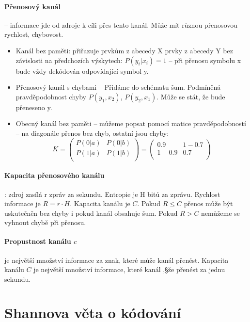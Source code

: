 \documentclass[a4paper, 11pt]{report}
\begin{document}
\paragraph{Přenosový kanál} -- informace jde od zdroje k cíli přes tento kanál. Může mít různou přenosovou rychlost, chybovost.
\begin{itemize}
	\item Kanál bez paměti: přiřazuje prvkům z abecedy X prvky z abecedy Y bez závislosti na předchozích výskytech: $P(y_i|x_i) = 1$ -- při přenosu symbolu x bude vždy dekódován odpovídající symbol y.
	\item Přenosový kanál s chybami -- Přidáme do schématu šum. Podmíněná pravděpodobnost chyby $P(y_1, x_2)$, $P(y_2, x_1)$. Může se stát, že bude přeneseno y.
	\item Obecný kanál bez paměti -- můžeme popsat pomocí matice pravděpodobností -- na diagonále přenos bez chyb, ostatní jsou chyby:
	$$K = 
	 \begin{pmatrix}
	  P(0|a) & P(0|b) \\
	  P(1|a) & P(1|b) \\
	 \end{pmatrix} =
	 \begin{pmatrix}
	  0.9 & 1-0.7 \\
	  1-0.9 & 0.7 \\
	 \end{pmatrix}$$
\end{itemize}

\paragraph{Kapacita přenosového kanálu}: zdroj zasílá r zpráv za sekundu. Entropie je H bitů za zprávu. Rychlost informace je $R = r \cdot H$. Kapacita kanálu je $C$. Pokud $R \leq C$ přenos může být uskutečněn bez chyby i pokud kanál obsahuje šum. Pokud $R > C$ nemůžeme se vyhnout chybě při přenosu.

\paragraph{Propustnost kanálu $c$} je největší množství informace za znak, které může kanál přenést. Kapacita kanálu $C$ je největší množství informace, které kanál ,§že přenést za jednu sekundu.


\section{Shannova věta o kódování}
\end{document}
